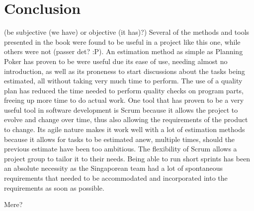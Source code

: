 \section{Conclusion}
(be subjective (we have) or objective (it has)?) Several of the methods and tools presented in the book \cite{caye} were found to be useful in a project like this one, while others were not (passer det? :P). 
An estimation method as simple as Planning Poker has proven to be were useful due its ease of use, needing almost no introduction, as well as its proneness to start discussions about the tasks being estimated, all without taking very much time to perform.
The use of a quality plan has reduced the time needed to perform quality checks on program parts, freeing up more time to do actual work.
One tool that has proven to be a very useful tool in software development is Scrum because it allows the project to evolve and change over time, thus also allowing the requirements of the product to change. Its agile nature makes it work well with a lot of estimation methods because it allows for tasks to be estimated anew, multiple times, should the previous estimate have been too ambitious. The flexibility of Scrum allows a project group to tailor it to their needs. Being able to run short sprints has been an absolute necessity as the Singaporean team had a lot of spontaneous requirements that needed to be accommodated and incorporated into the requirements as soon as possible.

Mere?